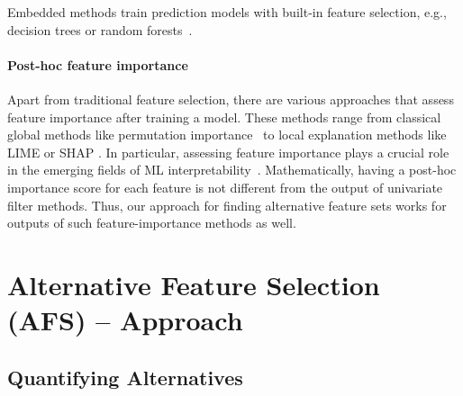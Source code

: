 \documentclass{article}
\theoremstyle{definition}
\begin{document}
Embedded methods train prediction models with built-in feature selection, e.g., decision trees or random forests~\cite{breiman2001random}.

\paragraph{Post-hoc feature importance}

Apart from traditional feature selection, there are various approaches that assess feature importance after training a model.
These methods range from classical global methods like permutation importance~\cite{breiman2001random} to local explanation methods like LIME \cite{ribeiro2016should} or SHAP \cite{lundberg2017unified}.
In particular, assessing feature importance plays a crucial role in the emerging fields of ML interpretability~\cite{carvalho2019machine}.
Mathematically, having a post-hoc importance score for each feature is not different from the output of univariate filter methods.
Thus, our approach for finding alternative feature sets works for outputs of such feature-importance methods as well.

\section{Alternative Feature Selection (AFS) -- Approach}
\label{sec:approach}

\subsection{Quantifying Alternatives}
\end{document}
